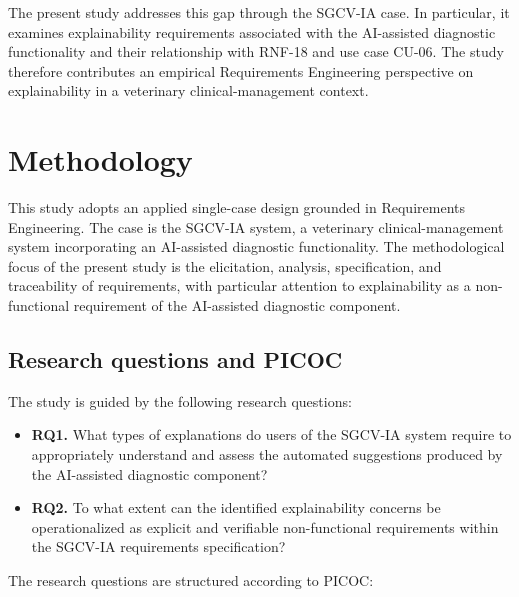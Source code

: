 \documentclass[pdflatex,sn-mathphys-num,Numbered]{sn-jnl}
\begin{document}
The present study addresses this gap through the SGCV-IA case. In particular, it examines explainability requirements associated with the AI-assisted diagnostic functionality and their relationship with RNF-18 and use case CU-06. The study therefore contributes an empirical Requirements Engineering perspective on explainability in a veterinary clinical-management context.

\section{Methodology}\label{sec3}

This study adopts an applied single-case design grounded in Requirements Engineering. The case is the SGCV-IA system, a veterinary clinical-management system incorporating an AI-assisted diagnostic functionality. The methodological focus of the present study is the elicitation, analysis, specification, and traceability of requirements, with particular attention to explainability as a non-functional requirement of the AI-assisted diagnostic component.

\subsection{Research questions and PICOC}\label{subsec1}

The study is guided by the following research questions:

\begin{itemize}
\item \textbf{RQ1.} What types of explanations do users of the SGCV-IA system require to appropriately understand and assess the automated suggestions produced by the AI-assisted diagnostic component?
\item \textbf{RQ2.} To what extent can the identified explainability concerns be operationalized as explicit and verifiable non-functional requirements within the SGCV-IA requirements specification?
\end{itemize}

The research questions are structured according to PICOC:
\end{document}
